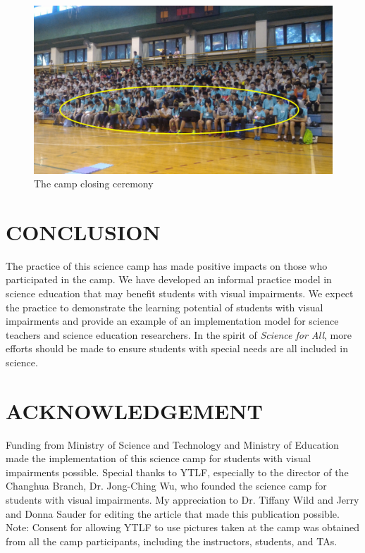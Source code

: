 \documentclass[11.5pt]{sig-alternate} %
\begin{document}
\begin{large}
\begin{figure}[h]
    \centering
    \includegraphics[width=1\linewidth]{Fig6.png}
    \caption{The camp closing ceremony}
\end{figure}

\section*{CONCLUSION}

The practice of this science camp has made positive impacts on those who participated in the camp. We have developed an informal practice model in science education that may benefit students with visual impairments. We expect the practice to demonstrate the learning potential of students with visual impairments and provide an example of an implementation model for science teachers and science education researchers. In the spirit of \textit{Science for All}, more efforts should be made to ensure students with special needs are all included in science.


\section*{ACKNOWLEDGEMENT}

Funding from Ministry of Science and Technology and Ministry of Education made the implementation of this science camp for students with visual impairments possible. Special thanks to YTLF, especially to the director of the Changhua Branch, Dr. Jong-Ching Wu, who founded the science camp for students with visual impairments. My appreciation to Dr. Tiffany Wild and Jerry and Donna Sauder for editing the article that made this publication possible. Note: Consent for allowing YTLF to use pictures taken at the camp was obtained from all the camp participants, including the instructors, students, and TAs.

\end{large}
\clearpage
\end{document}
